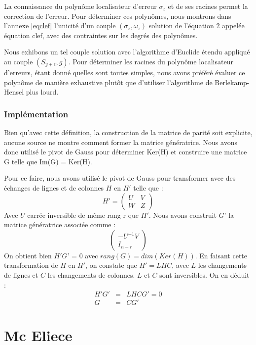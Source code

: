 \documentclass{article}
\begin{document}
			La connaissance du polynôme localisateur d'erreur $\sigma_{z}$ et de ses racines permet la correction de l'erreur.
			Pour déterminer ces polynômes, nous montrons dans l'annexe \ref{eqclef} l'unicité d'un couple $ (\sigma_{z},\omega_{z}) $ solution de l'équation 2 appelée équation clef, avec des contraintes sur les degrés des polynômes.

			Nous exhibons un tel couple solution avec l'algorithme d'Euclide étendu appliqué au couple $ (S_{y+\epsilon},g) $.
			Pour déterminer les racines du polynôme localisateur d'erreurs, étant donné quelles sont toutes simples, nous avons préféré évaluer ce polynôme de manière exhaustive plutôt que d'utiliser l'algorithme de Berlekamp-Hensel plus lourd.

		\section*{Implémentation}

			Bien qu'avec cette définition, la construction de la matrice de parité soit explicite, aucune source ne montre comment former la matrice génératrice.
			Nous avons donc utilisé le pivot de Gauss pour déterminer Ker(H) et construire une matrice G telle que Im(G) = Ker(H).

			Pour ce faire, nous avons utilisé le pivot de Gauss pour transformer avec des échanges de lignes et de colonnes $H$ en $H'$ telle que :
			$$ H' = 
			\begin{pmatrix}
				U & V \\
				W & Z
			\end{pmatrix}
			$$
			Avec $U$ carrée inversible de même rang r que $H'$.
			Nous avons construit $G$' la matrice génératrice associée comme :
			$$
			\begin{pmatrix}
				-U^{-1}V \\
				I_{n-r}
			\end{pmatrix}
			$$
			On obtient bien $H'G$' = 0 avec $rang(G) = dim(Ker(H))$.
			En faisant cette transformation de $H$ en $H'$, on constate que $H' = LHC$, avec $L$ les changements de lignes et $C$ les changements de colonnes.
			$L$ et $C$ sont inversibles.
			On en déduit :
			\begin{eqnarray*}
				H'G' &=& LHCG' = 0\\
				G &=& CG'
			\end{eqnarray*}


	\part*{Mc Eliece}
\end{document}
